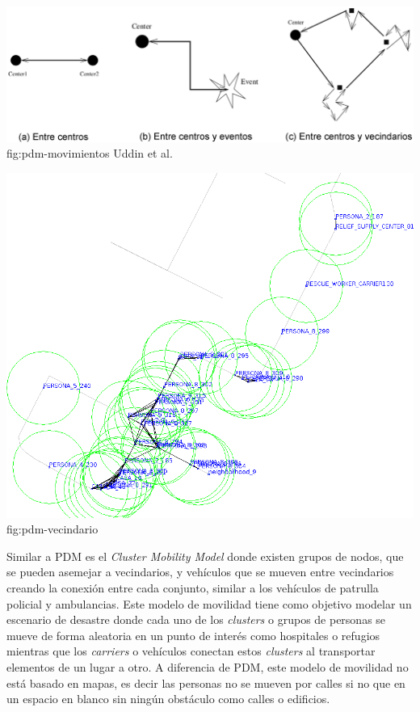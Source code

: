 {\includegraphics[scale=0.4]{imagenes/pdm/movimientos.eps}}{fig:pdm-movimientos}
{Uddin et al. \cite{uddin_post-disaster_2009}}



\newpage

{\includegraphics[scale=0.35]{imagenes/one/pdm_vecindario.png}}{fig:pdm-vecindario}





Similar a PDM es el \textit{Cluster Mobility Model} \cite{ozcan_post_2011} donde
existen grupos de nodos, que se pueden asemejar a vecindarios, y vehículos
que se mueven entre vecindarios creando la conexión entre cada conjunto, similar
a los vehículos de patrulla policial y ambulancias. Este modelo de movilidad
tiene como objetivo modelar un escenario de desastre donde cada uno de los
\textit{clusters} o grupos de personas se mueve de forma aleatoria en un punto
de interés como hospitales o refugios mientras que los \textit{carriers} o
vehículos conectan estos \textit{clusters} al transportar elementos de un lugar
a otro. A diferencia de PDM, este modelo de movilidad no está basado en mapas,
es decir las personas no se mueven por calles si no que en un espacio en blanco
sin ningún obstáculo como calles o edificios.



